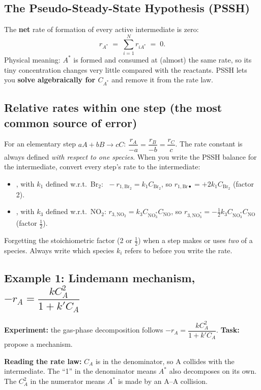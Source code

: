 \documentclass[11pt]{article}
\begin{document}
\subsection{The Pseudo-Steady-State Hypothesis (PSSH)}
\begin{keyresult}[PSSH]
The \textbf{net} rate of formation of every active intermediate is zero:
\[
r_{A^*} \;=\; \sum_{i=1}^{N} r_{iA^*} \;=\; 0 .
\]
Physical meaning: $A^*$ is formed and consumed at (almost) the same rate, so its tiny concentration changes very little
compared with the reactants. PSSH lets you \textbf{solve algebraically for $C_{A^*}$} and remove it from the rate law.
\end{keyresult}

\subsection{Relative rates within one step (the most common source of error)}
For an elementary step $aA+bB\to cC$: $\dfrac{r_A}{-a}=\dfrac{r_B}{-b}=\dfrac{r_C}{c}$.
The rate constant is always defined \emph{with respect to one species}. When you write the PSSH balance for the
intermediate, convert every step's rate to the intermediate:
\begin{itemize}
\item {}, with $k_1$ defined w.r.t.\ Br$_2$: $\;-r_{1,\mathrm{Br_2}}=k_1C_{\mathrm{Br_2}}$, so
$r_{1,\mathrm{Br}\bullet}=+2k_1C_{\mathrm{Br_2}}$ \quad(factor 2).
\item {}, with $k_3$ defined w.r.t.\ NO$_2$: $r_{3,\mathrm{NO_2}}=k_3C_{\mathrm{NO_3^*}}C_{\mathrm{NO}}$,
so $r_{3,\mathrm{NO_3^*}}=-\tfrac12 k_3C_{\mathrm{NO_3^*}}C_{\mathrm{NO}}$ \quad(factor $\tfrac12$).
\end{itemize}
\begin{mistake}
Forgetting the stoichiometric factor (2 or $\tfrac12$) when a step makes or uses \emph{two} of a species. Always write
which species $k_i$ refers to before you write the rate.
\end{mistake}

\subsection{Example 1: Lindemann mechanism, $-r_A=\dfrac{kC_A^2}{1+k'C_A}$}
\textbf{Experiment:} the gas-phase decomposition  follows $-r_A=\dfrac{kC_A^2}{1+k'C_A}$.
\textbf{Task:} propose a mechanism.

\textbf{Reading the rate law:} $C_A$ is in the denominator, so A collides with the intermediate. The ``1'' in the
denominator means $A^*$ also decomposes on its own. The $C_A^2$ in the numerator means $A^*$ is made by an A--A collision.
\end{document}
